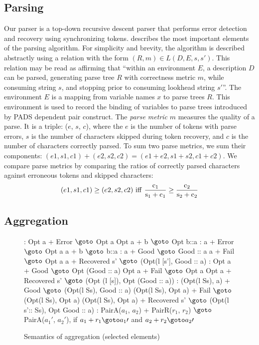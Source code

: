 \subsection{Parsing}
\label{sec:parse}
Our parser is a top-down recursive descent parser
that performs error detection and recovery using synchronizing tokens.
 describes the most important elements
of the parsing algorithm.  For simplicity and brevity,
the algorithm is described abstractly
using a relation with the form 
$(R, m) \in L(D, E, s, s')$.  This relation may be
read as affirming that ``within an environment $E$, a description $D$
can be parsed, generating parse tree $R$ with correctness metric $m$, 
while consuming string $s$, and stopping prior to consuming lookhead 
string $s'$''.  The environment $E$ is a mapping from variable names
$x$ to parse trees $R$.  This environment is used to record the
binding of variables to parse trees introduced by PADS dependent
pair construct.
The {\em parse metric} $m$ measures the quality of a parse. It is a 
triple: ($e$, $s$, $c$), where the $e$ is the number of tokens
with parse errors, $s$ is the number of 
characters skipped during  token recovery, 
and $c$ is the number of characters correctly parsed. 
To sum two parse metrics, we sum their components:
$(e1, s1, c1) + (e2, s2, c2) = (e1 + e2, s1 + s2, c1 + c2)$.
We compare parse metrics by comparing the ratios of correctly
parsed characters against erroneous tokens and skipped characters:
\[
(e1, s1, c1) \ge (  e2, s2, c2)~ \rm{iff}~ \frac{c_1}{s_1+c_1} \ge \frac{c_2}{s_2 + c_2}
\]

\subsection{Aggregation}
\begin{figure}[t]
\centering
\begin{code}
\cdmath
{}:
  Opt a + Error $\goto$ Opt a
  Opt a + b     $\goto$ Opt b::a
\mbox{}
:
  a + Error $\goto$ Opt a
  a + b     $\goto$ b::a
\mbox{}
: 
  a + Good $\goto$ Good :: a
  a + Fail $\goto$ Opt a
  a + Recovered s' $\goto$ (Opt(l [s'], Good :: a)
\mbox{}
: 
  Opt a + Good $\goto$ Opt (Good :: a)
  Opt a + Fail $\goto$ Opt a
  Opt a + Recovered s' $\goto$ 
    (Opt (l [s]), Opt (Good :: a))
\mbox{}
:
  (Opt(l Ss), a) + Good $\goto$ 
    (Opt(l Ss), Good :: a)
  (Opt(l Ss), Opt a) + Fail $\goto$ 
    (Opt(l Ss), Opt a)
  (Opt(l Ss), Opt a) + Recovered s' $\goto$ 
    (Opt(l s':: Ss), Opt Good :: a)
\mbox{}
:
  PairA($a_1$, $a_2$) + PairR($r_1$, $r_2$) $\goto$ 
    PairA($a_1\prime$, $a_2\prime$),
    if  $a_1 + r_1 \goto a_1\prime$
    and $a_2 + r_2 \goto a_2\prime$
\end{code}
\caption{Semantics of aggregation (selected elements)}
\label{fig:aggr-sem}
\end{figure}

